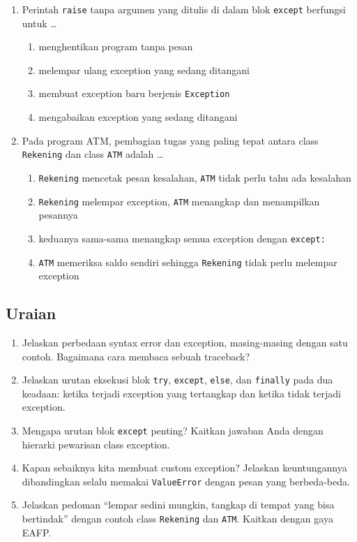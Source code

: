 \begin{enumerate}
  \item Perintah \texttt{raise} tanpa argumen yang ditulis di dalam blok \texttt{except} berfungsi untuk \ldots
  \begin{enumerate}[label=\alph*.,itemsep=0pt]
    \item menghentikan program tanpa pesan
    \item melempar ulang exception yang sedang ditangani
    \item membuat exception baru berjenis \texttt{Exception}
    \item mengabaikan exception yang sedang ditangani
  \end{enumerate}

  \item Pada program ATM, pembagian tugas yang paling tepat antara class \texttt{Rekening} dan class \texttt{ATM} adalah \ldots
  \begin{enumerate}[label=\alph*.,itemsep=0pt]
    \item \texttt{Rekening} mencetak pesan kesalahan, \texttt{ATM} tidak perlu tahu ada kesalahan
    \item \texttt{Rekening} melempar exception, \texttt{ATM} menangkap dan menampilkan pesannya
    \item keduanya sama-sama menangkap semua exception dengan \texttt{except:}
    \item \texttt{ATM} memeriksa saldo sendiri sehingga \texttt{Rekening} tidak perlu melempar exception
  \end{enumerate}
\end{enumerate}

\subsection{Uraian}

\begin{enumerate}
  \item Jelaskan perbedaan syntax error dan exception, masing-masing dengan satu contoh. Bagaimana cara membaca sebuah traceback?
  \item Jelaskan urutan eksekusi blok \texttt{try}, \texttt{except}, \texttt{else}, dan \texttt{finally} pada dua keadaan: ketika terjadi exception yang tertangkap dan ketika tidak terjadi exception.
  \item Mengapa urutan blok \texttt{except} penting? Kaitkan jawaban Anda dengan hierarki pewarisan class exception.
  \item Kapan sebaiknya kita membuat custom exception? Jelaskan keuntungannya dibandingkan selalu memakai \texttt{ValueError} dengan pesan yang berbeda-beda.
  \item Jelaskan pedoman ``lempar sedini mungkin, tangkap di tempat yang bisa bertindak'' dengan contoh class \texttt{Rekening} dan \texttt{ATM}. Kaitkan dengan gaya EAFP.
\end{enumerate}

